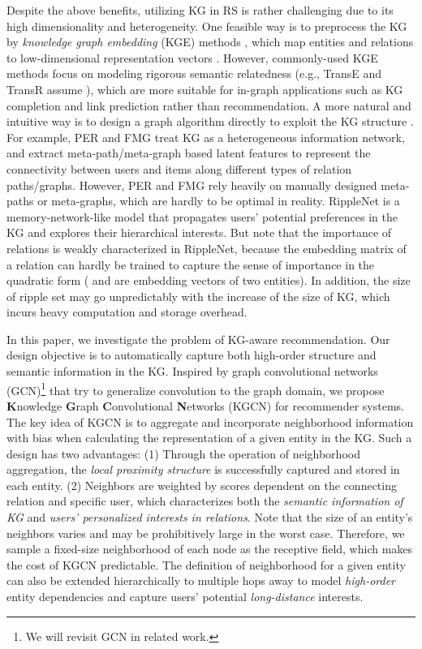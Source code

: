 \documentclass[sigconf]{acmart}
\begin{document}
	Despite the above benefits, utilizing KG in RS is rather challenging due to its high dimensionality and heterogeneity.
	One feasible way is to preprocess the KG by \textit{knowledge graph embedding} (KGE) methods \cite{wang2017knowledge}, which map entities and relations to low-dimensional representation vectors \cite{zhang2016collaborative,wang2018dkn,huang2018improving}.
	However, commonly-used KGE methods focus on modeling rigorous semantic relatedness (e.g., TransE \cite{bordes2013translating} and TransR \cite{lin2015learning} assume ), which are more suitable for in-graph applications such as KG completion and link prediction rather than recommendation.
	A more natural and intuitive way is to design a graph algorithm directly to exploit the KG structure \cite{yu2014personalized,zhao2017meta,wang2018ripple}.
	For example, PER \cite{yu2014personalized} and FMG \cite{zhao2017meta} treat KG as a heterogeneous information network, and extract meta-path/meta-graph based latent features to represent the connectivity between users and items along different types of relation paths/graphs.
	However, PER and FMG rely heavily on manually designed meta-paths or meta-graphs, which are hardly to be optimal in reality.
	RippleNet \cite{wang2018ripple} is a memory-network-like model that propagates users' potential preferences in the KG and explores their hierarchical interests.
	But note that the importance of relations is weakly characterized in RippleNet, because the embedding matrix of a relation  can hardly be trained to capture the sense of importance in the quadratic form  ( and  are embedding vectors of two entities).
	In addition, the size of ripple set may go unpredictably with the increase of the size of KG, which incurs heavy computation and storage overhead.
	
	In this paper, we investigate the problem of KG-aware recommendation.
	Our design objective is to automatically capture both high-order structure and semantic information in the KG.	Inspired by graph convolutional networks (GCN)\footnote{We will revisit GCN in related work.} that try to generalize convolution to the graph domain, we propose \textbf{K}nowledge \textbf{G}raph \textbf{C}onvolutional \textbf{N}etworks (KGCN) for recommender systems.
	The key idea of KGCN is to aggregate and incorporate neighborhood information with bias when calculating the representation of a given entity in the KG.
	Such a design has two advantages:
	(1) Through the operation of neighborhood aggregation, the \textit{local proximity structure} is successfully captured and stored in each entity.
	(2) Neighbors are weighted by scores dependent on the connecting relation and specific user, which characterizes both the \textit{semantic information of KG} and \textit{users' personalized interests in relations}.
	Note that the size of an entity's neighbors varies and may be prohibitively large in the worst case.
	Therefore, we sample a fixed-size neighborhood of each node as the receptive field, which makes the cost of KGCN predictable.
The definition of neighborhood for a given entity can also be extended hierarchically to multiple hops away to model \textit{high-order} entity dependencies and capture users' potential \textit{long-distance} interests.
	
\end{document}
